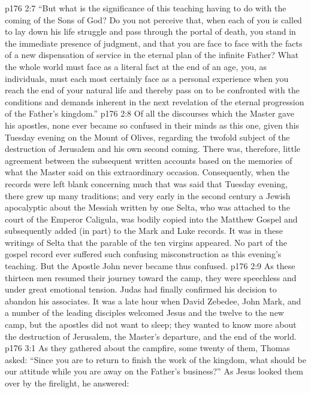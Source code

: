 \vs p176 2:7 \textcolor{ubdarkred}{“But what is the significance of this teaching having to do with the coming of the Sons of God? Do you not perceive that, when each of you is called to lay down his life struggle and pass through the portal of death, you stand in the immediate presence of judgment, and that you are face to face with the facts of a new dispensation of service in the eternal plan of the infinite Father? What the whole world must face as a literal fact at the end of an age, you, as individuals, must each most certainly face as a personal experience when you reach the end of your natural life and thereby pass on to be confronted with the conditions and demands inherent in the next revelation of the eternal progression of the Father’s kingdom.”}
\vs p176 2:8 Of all the discourses which the Master gave his apostles, none ever became so confused in their minds as this one, given this Tuesday evening on the Mount of Olives, regarding the twofold subject of the destruction of Jerusalem and his own second coming. There was, therefore, little agreement between the subsequent written accounts based on the memories of what the Master said on this extraordinary occasion. Consequently, when the records were left blank concerning much that was said that Tuesday evening, there grew up many traditions; and very early in the second century a Jewish apocalyptic about the Messiah written by one Selta, who was attached to the court of the Emperor Caligula, was bodily copied into the Matthew Gospel and subsequently added (in part) to the Mark and Luke records. It was in these writings of Selta that the parable of the ten virgins appeared. No part of the gospel record ever suffered such confusing misconstruction as this evening’s teaching. But the Apostle John never became thus confused.
\vs p176 2:9 As these thirteen men resumed their journey toward the camp, they were speechless and under great emotional tension. Judas had finally confirmed his decision to abandon his associates. It was a late hour when David Zebedee, John Mark, and a number of the leading disciples welcomed Jesus and the twelve to the new camp, but the apostles did not want to sleep; they wanted to know more about the destruction of Jerusalem, the Master’s departure, and the end of the world.
\vs p176 3:1 As they gathered about the campfire, some twenty of them, Thomas asked: “Since you are to return to finish the work of the kingdom, what should be our attitude while you are away on the Father’s business?” As Jesus looked them over by the firelight, he answered:
